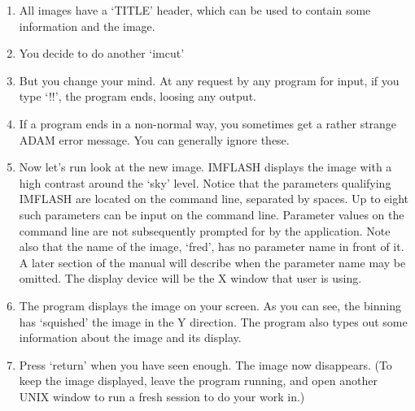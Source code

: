 {\begin{enumerate}
\item All images have a `TITLE' header, which can be used to contain
      some information and the image.
 
\item You decide to do another `imcut'
 
\item But you change your mind. At any request by any program for input,
      if you type `!!', the program ends, loosing any output.
 
\item If a program ends in a non-normal way, you sometimes get a rather
      strange ADAM error message. You can generally ignore these.
 
\item Now let's run look at the new image. IMFLASH displays the image with
      a high contrast around the `sky' level. Notice that the parameters
      qualifying IMFLASH are located on the command line, separated by spaces.
      Up to eight such parameters can be input on the command line. Parameter
      values on the command line are not subsequently prompted for by the
      application. Note also that the name of the image, `fred', has no parameter
      name in front of it. A later section of the manual will describe when the
      parameter name may be omitted. The display device will be the X window
      that user is using.
 
\item The program displays the image on your screen.
      As you can see, the binning has `squished' the image in the Y direction.
      The program also types out some information about the image and its
      display.
 
\item Press `return' when you have seen enough. The image now disappears.
      (To keep the image displayed, leave the program running, and open
       another UNIX window to run a fresh \starman session to do your
       work in.)
 
\end{enumerate}
} 

\newpage

